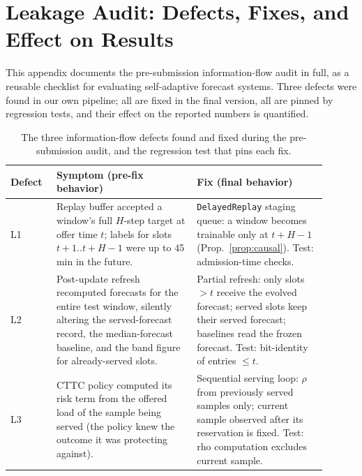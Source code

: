 \section{Leakage Audit: Defects, Fixes, and Effect on Results}
\label{app:audit}

This appendix documents the pre-submission information-flow audit in
full, as a reusable checklist for evaluating self-adaptive forecast
systems. Three defects were found in our own pipeline; all are fixed
in the final version, all are pinned by regression tests, and their
effect on the reported numbers is quantified.

\begin{table}[!t]
\caption{The three information-flow defects found and fixed during
the pre-submission audit, and the regression test that pins each
fix.}
\label{tab:audit}
\centering
\small
\setlength{\tabcolsep}{3pt}
\begin{tabular}{@{}p{0.13\linewidth}p{0.40\linewidth}p{0.37\linewidth}@{}}
\toprule
Defect & Symptom (pre-fix behavior) & Fix (final behavior) \\
\midrule
L1 & Replay buffer accepted a window's full $H$-step target at offer
time $t$; labels for slots $t{+}1..t{+}H{-}1$ were up to 45 min in
the future. & \texttt{DelayedReplay} staging queue: a window becomes
trainable only at $t{+}H{-}1$ (Prop.~\ref{prop:causal}).
Test: admission-time checks. \\
\midrule
L2 & Post-update refresh recomputed forecasts for the entire test
window, silently altering the served-forecast record, the
median-forecast baseline, and the band figure for already-served
slots. & Partial refresh: only slots $> t$ receive the evolved
forecast; served slots keep their served forecast; baselines read
the frozen forecast.
Test: bit-identity of entries $\le t$. \\
\midrule
L3 & CTTC policy computed its risk term from the offered load of the
sample being served (the policy knew the outcome it was protecting
against). & Sequential serving loop: $\rho$ from previously served
samples only; current sample observed after its reservation is
fixed.
Test: rho computation excludes current sample. \\
\bottomrule
\end{tabular}
\end{table}


